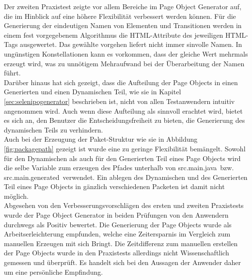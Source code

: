 Der zweiten Praxistest zeigte vor allem Bereiche im Page Object Generator auf, die im Hinblick auf eine höhere Flexibilität verbessert werden können.
Für die Generierung der eindeutigen Namen von Elementen und Transitionen werden in einem fest vorgegebenem Algorithmus die HTML-Attribute des jeweiligen HTML-Tags ausgewertet. Das gewählte vorgehen liefert nicht immer sinvolle Namen. In ungünstigen Konstellationen kann es vorkommen, dass der gleiche Wert mehrmals erzeugt wird, was zu unnötigem Mehraufwand bei der Überarbeitung der Namen führt.\\
Darüber hinaus hat sich gezeigt, dass die Aufteilung der Page Objects in einen Generierten und einen Dynamischen Teil, wie sie in Kapitel \ref{sec:selenipogenerator} beschrieben ist, nicht von allen Testanwendern intuitiv angenommen wird.
Auch wenn diese Aufteilung als sinnvoll erachtet wird, bietet es sich an, den Benutzer die Entscheidungsfreiheit zu bieten, die Generierung des dynamischen Teils zu verhindern.\\
Auch bei der Erzeugung der Paket-Struktur wie sie in Abbildung \ref{fig:packagepath} gezeigt ist wurde eine zu geringe Flexibilität bemängelt.
Sowohl für den Dynamischen als auch für den Generierten Teil eines Page Objects wird die selbe Variable zum erzeugen des Pfades unterhalb von \grq src.main.java\grq\ bzw. \grq src.main.generated\grq\ verwendet. Ein ablegen des Dynamischen und des Generierten Teil eines Page Objects in gänzlich verschiedenen Packeten ist damit nicht möglich.\\
Abgesehen von den Verbesserungsvorschlägen des ersten und zweiten Praxistests wurde der Page Object Generator in beiden Prüfungen von den Anwendern durchwegs als Positiv bewertet. Die Generierung der Page Objects wurde als Arbeitserleichterung empfunden, welche eine Zeitersparnis im Vergleich zum manuellen Erzeugen mit sich Bringt. Die Zeitdifferenz zum manuellen erstellen der Page Objects wurde in den Praxistests allerdings nicht Wissenschaftlich gemessen und überprüft. Es handelt sich bei den Aussagen der Anwender daher um eine persönliche Empfindung.


